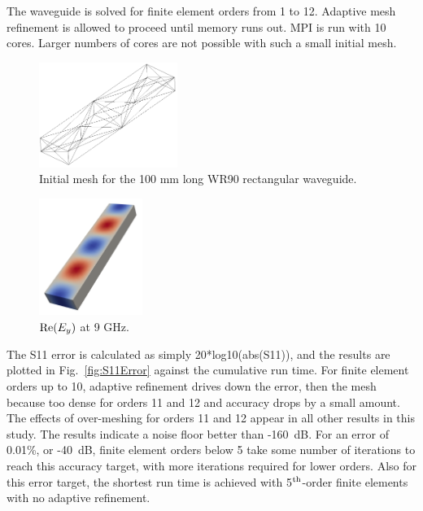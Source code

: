 \documentclass[titlepage]{article}
\renewcommand\_{\textunderscore\linebreak[1]}
\begin{document}
The waveguide is solved for finite element orders from 1 to 12.  Adaptive mesh refinement is allowed to proceed until  memory runs out.  MPI is run with 10 cores.  Larger numbers of cores are not possible with such a small initial mesh.

\begin{figure}[H]
  \centering
  \includegraphics[width=0.4\textwidth]{../regression/OpenParEM3D/WR90/straight_study/screenshots/WR90mesh}
  \caption{Initial mesh for the 100 mm long WR90 rectangular waveguide.}
  \label{fig:WR90mesh}
\end{figure}

\begin{figure}[H]
  \centering
  \includegraphics[width=0.3\textwidth]{../regression/OpenParEM3D/WR90/straight_study/screenshots/WR90ReEy}
  \caption{$\textnormal{Re}(E_y)$ at 9 GHz.}
  \label{fig:WR90ReEy}
\end{figure}

The S11 error is calculated as simply 20*log10(abs(S11)), and the results are plotted in Fig.~\ref{fig:S11Error} against the cumulative run time.  For finite element orders up to 10, adaptive refinement drives down the error, then the mesh because too dense for orders 11 and 12 and accuracy drops by a small amount. The effects of over-meshing for orders 11 and 12 appear in all other results in this study.  The results indicate a noise floor better than -160~dB.  For an error of 0.01\%, or -40~dB, finite element orders below 5 take some number of iterations to reach this accuracy target, with more iterations required for lower orders.  Also for this error target, the shortest run time is achieved with 5$^{\textnormal{th}}$-order finite elements with no adaptive refinement.
\end{document}
